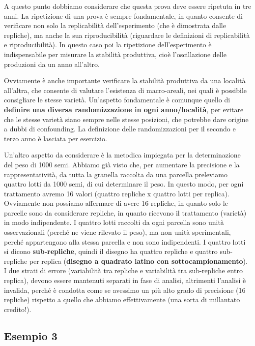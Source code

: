 \documentclass[a4paper,12pt,oneside]{book}
\theoremstyle{definition}
\theoremstyle{definition}
\theoremstyle{definition}
\theoremstyle{remark}
\begin{document}
A questo punto dobbiamo considerare che questa prova deve essere
ripetuta in tre anni. La ripetizione di una prova è sempre fondamentale,
in quanto consente di verificare non solo la replicabilità
dell'esperimento (che è dimostrata dalle repliche), ma anche la sua
riproducibilità (riguardare le definizioni di replicabilità e
riproducibilità). In questo caso poi la ripetizione dell'esperimento è
indispensabile per misurare la stabilità produttiva, cioè l'oscillazione
delle produzioni da un anno all'altro.

Ovviamente è anche importante verificare la stabilità produttiva da una
località all'altra, che consente di valutare l'esistenza di
macro-areali, nei quali è possibile consigliare le stesse varietà.
Un'aspetto fondamentale è comunque quello di \textbf{definire una
diversa randomizzazione in ogni anno/località}, per evitare che le
stesse varietà siano sempre nelle stesse posizioni, che potrebbe dare
origine a dubbi di confounding. La definizione delle randomizzazioni per
il secondo e terzo anno è lasciata per esercizio.

Un'altro aspetto da considerare è la metodica impiegata per la
determinazione del peso di 1000 semi. Abbiamo già visto che, per
aumentare la precisione e la rappresentatività, da tutta la granella
raccolta da una parcella preleviamo quattro lotti da 1000 semi, di cui
determinare il peso. In questo modo, per ogni trattamento avremo 16
valori (quattro repliche x quattro lotti per replica). Ovviamente non
possiamo affermare di avere 16 repliche, in quanto solo le parcelle sono
da considerare repliche, in quanto ricevono il trattamento (varietà) in
modo indipendente. I quattro lotti raccolti da ogni parcella sono unità
osservazionali (perché ne viene rilevato il peso), ma non unità
sperimentali, perché appartengono alla stessa parcella e non sono
indipendenti. I quattro lotti si dicono \textbf{sub-repliche}, quindi il
disegno ha quattro repliche e quattro sub-repliche per replica
(\textbf{disegno a quadrato latino con sottocampionamento}). I due
strati di errore (variabilità tra repliche e variabilità tra
sub-repliche entro replica), devono essere mantenuti separati in fase di
analisi, altrimenti l'analisi è invalida, perché è condotta come se
avessimo un più alto grado di precisione (16 repliche) rispetto a quello
che abbiamo effettivamente (una sorta di millantato credito!).

\subsection{Esempio 3}\label{esempio-3-1}
\end{document}
